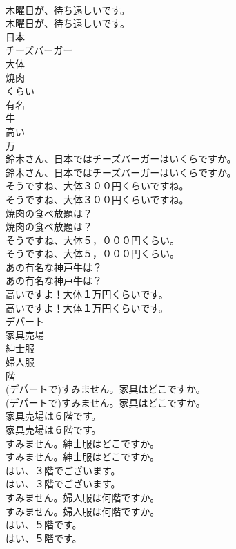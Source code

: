 \documentclass[8pt]{extreport}
\begin{document}
\begin{CJK}{UTF8}{min}
\\	木曜日が、待ち遠しいです。	
\\	木曜日が、待ち遠しいです。 
\\	日本
\\	チーズバーガー
\\	大体
\\	焼肉
\\	くらい
\\	有名
\\	牛
\\	高い
\\	万
\\	鈴木さん、日本ではチーズバーガーはいくらですか。	
\\	鈴木さん、日本ではチーズバーガーはいくらですか。 
\\	そうですね、大体３００円くらいですね。	
\\	そうですね、大体３００円くらいですね。 
\\	焼肉の食べ放題は？	
\\	焼肉の食べ放題は？ 
\\	そうですね、大体５，０００円くらい。	
\\	そうですね、大体５，０００円くらい。 
\\	あの有名な神戸牛は？	
\\	あの有名な神戸牛は？ 
\\	高いですよ！大体１万円くらいです。	
\\	高いですよ！大体１万円くらいです。 
\\	デパート
\\	家具売場
\\	紳士服
\\	婦人服
\\	階
\\	(デパートで)すみません。家具はどこですか。	
\\	(デパートで)すみません。家具はどこですか。 
\\	家具売場は６階です。	
\\	家具売場は６階です。 
\\	すみません。紳士服はどこですか。	
\\	すみません。紳士服はどこですか。 
\\	はい、３階でございます。	
\\	はい、３階でございます。 
\\	すみません。婦人服は何階ですか。	
\\	すみません。婦人服は何階ですか。 
\\	はい、５階です。	
\\	はい、５階です。 

\end{CJK}
\end{document}
